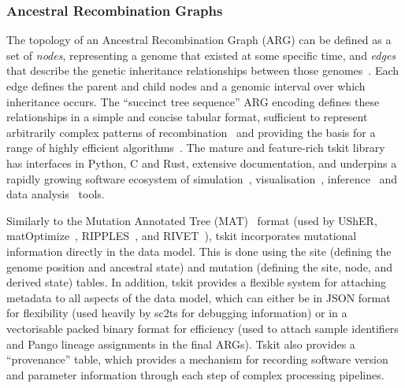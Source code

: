 \documentclass[12pt]{article}
\begin{document}
\subsubsection*{Ancestral Recombination Graphs}
\label{sec:args}
The topology of an Ancestral Recombination Graph (ARG) can be defined
as a set of \emph{nodes}, representing a genome that existed at some specific time,
and \emph{edges} that describe the genetic inheritance relationships between those
genomes~\cite{Wong2024}.
Each edge defines the parent and child nodes and a genomic interval
over which inheritance occurs. The ``succinct tree sequence'' ARG encoding defines
these relationships in a simple and concise tabular format,
sufficient to represent arbitrarily complex patterns of
recombination~\cite{Wong2024} and providing the basis for a range of highly
efficient
algorithms~\cite{Kelleher2016,Ralph2020,Kelleher2020coalescent,
Grundler2025geographic,Lehmann2025args}.
The mature and feature-rich tskit library~\cite{Jeffery2026population}
has interfaces in Python, C and Rust,
extensive documentation,
and underpins a rapidly growing software ecosystem of
simulation~\cite{Baumdicker2022,Haller2019,Petr2023,Tsambos2023link,Tagami2024tstrait,Gopalan2025bridging},
visualisation~\cite{Karthikeyan2025tsbrowse,Kitchens2025tskit,Talbot2025argscape,Katte2026interactive},
inference~\cite{Kelleher2019,Wohns2022,Mahmoudi2022,Martin2025model,Pieszko2025detecting,
Pope2025}
and data
analysis~\cite{Fan2022,Nowbandegani2023extremely,Fritze2024forest,Lee2025genetic}
tools.

Similarly to the Mutation Annotated Tree (MAT)~\cite{McBroome2021} format
(used by
UShER\cite{Turakhia2021},
matOptimize~\cite{DeMaio2023},
RIPPLES~\cite{Turakhia2022}, and
RIVET~\cite{Smith2023tracking}),
tskit incorporates mutational information directly in the data model.
This is done using
the site (defining the genome position and ancestral state) and
mutation (defining the site, node, and derived state)
tables.
In addition, tskit provides a flexible system for attaching metadata
to all aspects of the data model, which can either be in JSON format
for flexibility (used heavily by sc2ts for debugging information)
or in a vectorisable packed binary format for efficiency
(used to attach sample identifiers and Pango lineage assignments in the final ARGs).
Tskit also provides a ``provenance'' table,
which provides a mechanism for recording software version and
parameter information through each step of complex processing pipelines.
\end{document}
